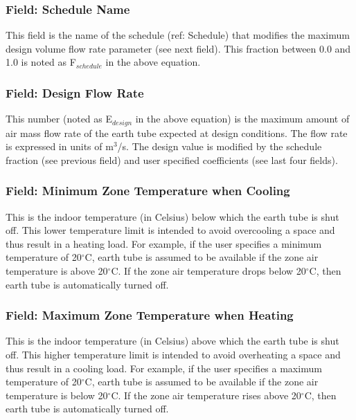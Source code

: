 \subsubsection{Field: Schedule Name}\label{field-schedule-name-6}

This field is the name of the schedule (ref: Schedule) that modifies the maximum design volume flow rate parameter (see next field). This fraction between 0.0 and 1.0 is noted as F\(_{schedule}\) in the above equation.

\subsubsection{Field: Design Flow Rate}\label{field-design-flow-rate-4}

This number (noted as E\(_{design}\) in the above equation) is the maximum amount of air mass flow rate of the earth tube expected at design conditions. The flow rate is expressed in units of m\(^{3}\)/s. The design value is modified by the schedule fraction (see previous field) and user specified coefficients (see last four fields).

\subsubsection{Field: Minimum Zone Temperature when Cooling}\label{field-minimum-zone-temperature-when-cooling}

This is the indoor temperature (in Celsius) below which the earth tube is shut off. This lower temperature limit is intended to avoid overcooling a space and thus result in a heating load. For example, if the user specifies a minimum temperature of 20$^\circ$C, earth tube is assumed to be available if the zone air temperature is above 20$^\circ$C. If the zone air temperature drops below 20$^\circ$C, then earth tube is automatically turned off.

\subsubsection{Field: Maximum Zone Temperature when Heating}\label{field-maximum-zone-temperature-when-heating}

This is the indoor temperature (in Celsius) above which the earth tube is shut off. This higher temperature limit is intended to avoid overheating a space and thus result in a cooling load. For example, if the user specifies a maximum temperature of 20$^\circ$C, earth tube is assumed to be available if the zone air temperature is below 20$^\circ$C. If the zone air temperature rises above 20$^\circ$C, then earth tube is automatically turned off.

